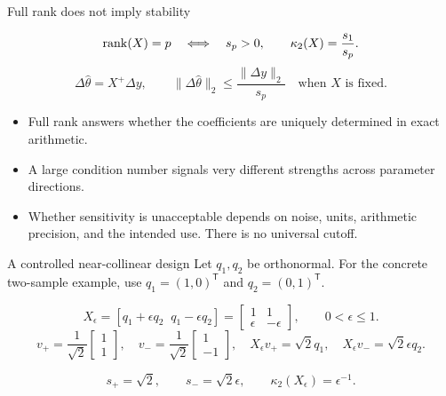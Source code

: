 \begin{frame}{Full rank does not imply stability}
\begin{definitionbox}
\[
 \operatorname{rank}(X)=p\quad\Longleftrightarrow\quad s_p>0,
 \qquad \kappa_2(X)=\frac{s_1}{s_p}.
\]
\[
 \Delta\widehat\theta=X^+\Delta y,
 \qquad
 \|\Delta\widehat\theta\|_2\leq\frac{\|\Delta y\|_2}{s_p}
 \quad\text{when $X$ is fixed.}
\]
\end{definitionbox}
\small
\begin{itemize}\setlength{\itemsep}{7pt}
\item Full rank answers whether the coefficients are uniquely determined in exact arithmetic.
\item A large condition number signals very different strengths across parameter directions.
\item Whether sensitivity is unacceptable depends on noise, units, arithmetic precision, and the intended use. There is no universal cutoff.
\end{itemize}
\end{frame}

\begin{frame}{A controlled near-collinear design}
\small
Let $q_1,q_2$ be orthonormal. For the concrete two-sample example, use
$q_1=(1,0)^{\mathsf T}$ and $q_2=(0,1)^{\mathsf T}$. 
\begin{definitionbox}
\[
 X_\epsilon=[q_1+\epsilon q_2\;\;q_1-\epsilon q_2]
 =\begin{bmatrix}1&1\\\epsilon&-\epsilon\end{bmatrix},
 \qquad 0<\epsilon\leq1.
\]
\[
 v_+=\frac{1}{\sqrt2}\begin{bmatrix}1\\1\end{bmatrix},\quad
 v_-=\frac{1}{\sqrt2}\begin{bmatrix}1\\-1\end{bmatrix},\quad
 X_\epsilon v_+=\sqrt2q_1,\quad X_\epsilon v_-=\sqrt2\epsilon q_2.
\]
\end{definitionbox}
\[
 s_+=\sqrt2,\qquad s_-=\sqrt2\epsilon,\qquad
 \kappa_2(X_\epsilon)=\epsilon^{-1}.
\]

\end{frame}

